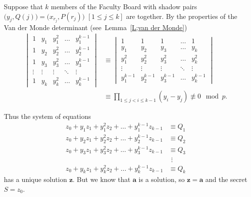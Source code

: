 \documentclass[12pt,a4paper]{article}
\theoremstyle{plain}
\theoremstyle{definition}
\begin{document}
    Suppose that $k$ members of the Faculty Board
    with shadow pairs
    $\big(y_{j},Q(j)\big)=\big(x_{r_{j}},P(r_{j})\big)$
    $[1\leq j\leq k]$ are together.
    By the properties of the Van der Monde determinant
    (see~Lemma~\ref{L;van der Monde})
    \begin{align*}
        \begin{vmatrix}
            1&y_{1}&y_{1}^{2}&\hdots&y_{1}^{k-1}\\
            1&y_{2}&y_{2}^{2}&\hdots&y_{2}^{k-1}\\
            1&y_{3}&y_{3}^{2}&\hdots&y_{3}^{k-1}\\
            \vdots&\vdots&\vdots&\ddots&\vdots\\
            1&y_{k}&y_{k}^{2}&\hdots&y_{k}^{k-1}
        \end{vmatrix}
        &\equiv
        \begin{vmatrix}
            1&1&1&\hdots&1\\
            y_{1}&y_{2}&y_{3}&\hdots&y_{k}\\
            y_{1}^{2}&y_{2}^{2}&y_{3}^{2}&\hdots&y_{k}^{2}\\
            \vdots&\vdots&\vdots&\ddots&\vdots\\
            y_{1}^{k-1}&y_{2}^{k-1}&y_{3}^{k-1}&\hdots&y_{k}^{k-1}
        \end{vmatrix}\\
        &\equiv\prod_{1\leq j<i\leq k-1}(y_{i}-y_{j})\not\equiv 0\mod{p}.
    \end{align*}

    Thus the system of equations
    \begin{align*}
        z_{0}+y_{1}z_{1}+y_{1}^{2}z_{2}+\hdots+y_{1}^{k-1}z_{k-1}
        &\equiv Q_{1}\\
        z_{0}+y_{2}z_{1}+y_{2}^{2}z_{2}+\hdots+y_{2}^{k-1}z_{k-1}
        &\equiv Q_{2}\\
        z_{0}+y_{3}z_{1}+y_{3}^{2}z_{2}+\hdots+y_{3}^{k-1}z_{k-1}
        &\equiv Q_{3}\\
        &\ \,\vdots\\
        z_{0}+y_{k}z_{1}+y_{k}^{2}z_{2}+\hdots+y_{k}^{k-1}z_{k-1}&\equiv Q_{k}
    \end{align*}
    has a unique solution ${\mathbf z}$. But we know that
    ${\mathbf a}$ is a solution, so ${\mathbf z}={\mathbf a}$
    and the secret $S=z_{0}$.
\end{document}
